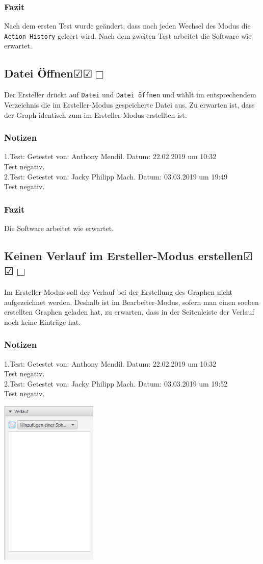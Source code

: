 \documentclass[enabledeprecatedfontcommands]{scrartcl}
\newcommand{\subsectiont}[2]{\subsection[#1]{#1{\normalsize\normalfont #2}}}
\newcommand{\leer}{$\Box$}
\newcommand{\ok}{$\CheckedBox$}
\begin{document}
\subsubsection{Fazit}
Nach dem ersten Test wurde geändert, dass nach jeden Wechsel des Modus die \texttt{Action History} geleert wird.
Nach dem zweiten Test arbeitet die Software wie erwartet. 

\subsectiont{Datei Öffnen}{\dotfill\ok\ok\leer}
Der Ersteller drückt auf \texttt{Datei} und \texttt{Datei öffnen} und wählt im entsprechendem Verzeichnis die im Ersteller-Modus gespeicherte Datei aus. Zu erwarten ist, dass der Graph identisch zum im Ersteller-Modus erstellten ist. 
\subsubsection{Notizen}
1.Test: Getestet von: Anthony Mendil. Datum: 22.02.2019 um 10:32 \\
Test negativ.\\
2.Test: Getestet von: Jacky Philipp Mach. Datum: 03.03.2019 um 19:49 \\
Test negativ.
\subsubsection{Fazit}
Die Software arbeitet wie erwartet.

\subsectiont{Keinen Verlauf im Ersteller-Modus erstellen}{\dotfill\ok\ok\leer}
Im Ersteller-Modus soll der Verlauf bei der Erstellung des Graphen nicht aufgezeichnet werden. Deshalb ist im Bearbeiter-Modus, sofern man einen soeben erstellten Graphen geladen hat, zu erwarten, dass in der Seitenleiste der Verlauf noch keine Einträge hat. 
\subsubsection{Notizen}
1.Test: Getestet von: Anthony Mendil. Datum: 22.02.2019 um 10:32 \\
Test negativ.\\
2.Test: Getestet von: Jacky Philipp Mach. Datum: 03.03.2019 um 19:52 \\
Test negativ.
\begin{center}
\includegraphics[height=8cm]{2_3.PNG}
\end{center}
\end{document}
